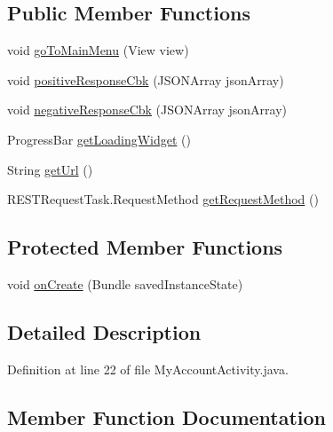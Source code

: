 \subsection*{Public Member Functions}
\begin{DoxyCompactItemize}
\item 
void \hyperlink{classcom_1_1bartekcios_1_1ticketsclient_1_1_my_account_activity_a49fdf07d7bf1031fa57e27791d434761}{go\+To\+Main\+Menu} (View view)
\item 
void \hyperlink{classcom_1_1bartekcios_1_1ticketsclient_1_1_my_account_activity_a93fbbfcbbd1ad14a90b5d4ec9c736dbf}{positive\+Response\+Cbk} (J\+S\+O\+N\+Array json\+Array)
\item 
void \hyperlink{classcom_1_1bartekcios_1_1ticketsclient_1_1_my_account_activity_a1daabfc4e737756c8bbe212d62a2fc15}{negative\+Response\+Cbk} (J\+S\+O\+N\+Array json\+Array)
\item 
Progress\+Bar \hyperlink{classcom_1_1bartekcios_1_1ticketsclient_1_1_my_account_activity_ae072a66ad70be5fcdae7fa2cab045eab}{get\+Loading\+Widget} ()
\item 
String \hyperlink{classcom_1_1bartekcios_1_1ticketsclient_1_1_my_account_activity_aeaa4e36c6a93bfc13f27cfae2c795074}{get\+Url} ()
\item 
R\+E\+S\+T\+Request\+Task.\+Request\+Method \hyperlink{classcom_1_1bartekcios_1_1ticketsclient_1_1_my_account_activity_a8f8f3ebb8ef30b89ea89838f25421a6f}{get\+Request\+Method} ()
\end{DoxyCompactItemize}
\subsection*{Protected Member Functions}
\begin{DoxyCompactItemize}
\item 
void \hyperlink{classcom_1_1bartekcios_1_1ticketsclient_1_1_my_account_activity_abff17442ef6ee7da8d675f5c8ba0d9bc}{on\+Create} (Bundle saved\+Instance\+State)
\end{DoxyCompactItemize}


\subsection{Detailed Description}


Definition at line 22 of file My\+Account\+Activity.\+java.



\subsection{Member Function Documentation}
\mbox{\label{classcom_1_1bartekcios_1_1ticketsclient_1_1_my_account_activity_ae072a66ad70be5fcdae7fa2cab045eab}} 
